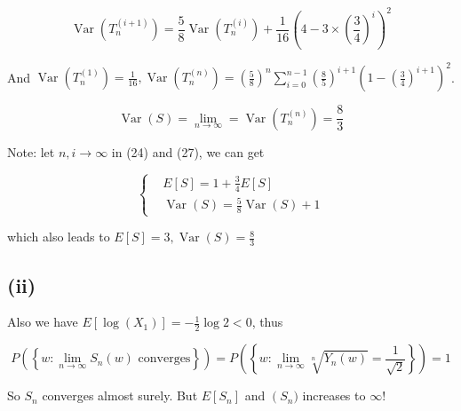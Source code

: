 \documentclass{article}
\begin{document}
\begin{equation}
    \operatorname{Var}(T_n^{(i+1)}) = \frac{5}{8} \operatorname{Var}(T_n^{(i)}) + \frac{1}{16} (4 - 3 \times (\frac{3}{4})^i)^2 
\end{equation}

And $ \operatorname{Var}(T_n^{(1)}) = \frac{1}{16}, \operatorname{Var}(T_n^{(n)}) = (\frac{5}{8})^n \sum\limits_{i=0}^{n-1}(\frac{8}{5})^{i+1} (1 -(\frac{3}{4})^{i+1})^2  $.

\begin{equation}
    \operatorname{Var}(S) = \lim_{n \to \infty}   =  \operatorname{Var}(T_n^{(n)}) = \frac{8}{3}
\end{equation}

Note: let $ n,i \to \infty$ in (24) and (27), we can get 

\begin{equation}
    \left\{
    \begin{aligned}
        & E[S] = 1 + \frac{3}{4} E[S] \\
        &\operatorname{Var}(S) = \frac{5}{8} \operatorname{Var}(S) + 1
    \end{aligned}
    \right.
\end{equation}

which also leads to $E[S] = 3, \operatorname{Var}(S) = \frac{8}{3}$

\subsection{(ii)}

Also we have $E[\log(X_1)] = -\frac{1}{2} \log2<0$, thus  

\begin{equation}
    P\left(\left\{w:\lim_{n\to \infty} S_n(w) \text{ converges} \right\}\right) = P\left(\left\{w:\lim_{n\to \infty} \sqrt[n]{Y_n(w)} = \frac{1}{\sqrt{2}}\right\}\right) = 1
\end{equation}

So $S_n$ converges almost surely. But $E[S_n]$ and $\operatorname(S_n)$ increases to $\infty$!
\end{document}
